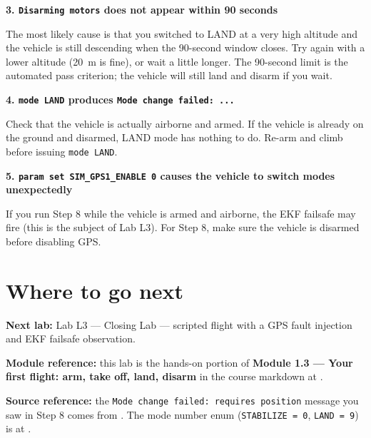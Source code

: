\documentclass[a4paper,11pt,twoside]{article}
\begin{document}
\textbf{3. \texttt{Disarming motors} does not appear within 90 seconds}

The most likely cause is that you switched to LAND at a very high altitude and the vehicle is still descending when the 90-second window closes. Try again with a lower altitude (20~m is fine), or wait a little longer. The 90-second limit is the automated pass criterion; the vehicle will still land and disarm if you wait.

\textbf{4. \texttt{mode LAND} produces \texttt{Mode change failed: ...}}

Check that the vehicle is actually airborne and armed. If the vehicle is already on the ground and disarmed, LAND mode has nothing to do. Re-arm and climb before issuing \texttt{mode LAND}.

\textbf{5. \texttt{param set SIM\_GPS1\_ENABLE 0} causes the vehicle to switch modes unexpectedly}

If you run Step 8 while the vehicle is armed and airborne, the EKF failsafe may fire (this is the subject of Lab L3). For Step 8, make sure the vehicle is disarmed before disabling GPS.

\section*{Where to go next}

\textbf{Next lab:} Lab L3 --- Closing Lab --- scripted flight with a GPS fault injection and EKF failsafe observation.

\textbf{Module reference:} this lab is the hands-on portion of \textbf{Module 1.3 --- Your first flight: arm, take off, land, disarm} in the course markdown at .

\textbf{Source reference:} the \texttt{Mode change failed: requires position} message you saw in Step 8 comes from . The mode number enum (\texttt{STABILIZE = 0}, \texttt{LAND = 9}) is at .

\fi
\end{document}
